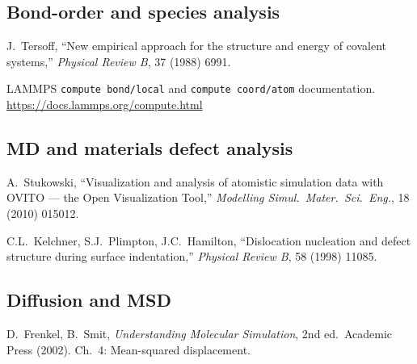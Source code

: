 \documentclass[11pt, a4paper, oneside]{article}
\begin{document}
\subsection*{Bond-order and species analysis}

\begin{enumerate}[resume, label={[\arabic*]}, leftmargin=2.2em]

  \item J.\ Tersoff,
	``New empirical approach for the structure and energy of covalent systems,''
	\textit{Physical Review B}, 37 (1988) 6991.

  \item LAMMPS \texttt{compute bond/local} and \texttt{compute coord/atom}
	documentation. \url{https://docs.lammps.org/compute.html}

\end{enumerate}

\subsection*{MD and materials defect analysis}

\begin{enumerate}[resume, label={[\arabic*]}, leftmargin=2.2em]

  \item A.\ Stukowski,
	``Visualization and analysis of atomistic simulation data with
	OVITO --- the Open Visualization Tool,''
	\textit{Modelling Simul.\ Mater.\ Sci.\ Eng.}, 18 (2010) 015012.

  \item C.L.\ Kelchner, S.J.\ Plimpton, J.C.\ Hamilton,
	``Dislocation nucleation and defect structure during surface indentation,''
	\textit{Physical Review B}, 58 (1998) 11085.

\end{enumerate}

\subsection*{Diffusion and MSD}

\begin{enumerate}[resume, label={[\arabic*]}, leftmargin=2.2em]

  \item D.\ Frenkel, B.\ Smit,
	\textit{Understanding Molecular Simulation}, 2nd ed.\
	Academic Press (2002). Ch.\ 4: Mean-squared displacement.

\end{enumerate}
\end{document}
